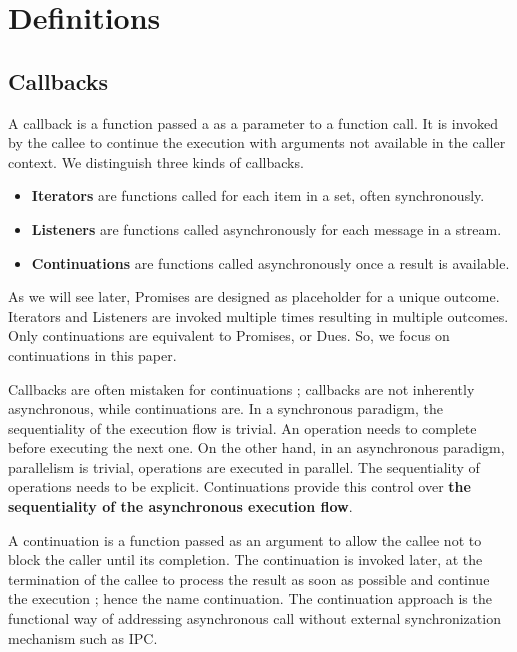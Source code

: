 \section{Definitions} \label{section:definitions}

\subsection{Callbacks} \label{section:definitions:continuation}

A callback is a function passed a as a parameter to a function call.
It is invoked by the callee to continue the execution with arguments not available in the caller context.
We distinguish three kinds of callbacks.

\begin{itemize}
  \item \textbf{Iterators} are functions called for each item in a set, often synchronously.
  \item \textbf{Listeners} are functions called asynchronously for each message in a stream.
  \item \textbf{Continuations} are functions called asynchronously once a result is available.
\end{itemize}

As we will see later, Promises are designed as placeholder for a unique outcome.
Iterators and Listeners are invoked multiple times resulting in multiple outcomes.
Only continuations are equivalent to Promises, or Dues.
So, we focus on continuations in this paper.

Callbacks are often mistaken for continuations ; callbacks are not inherently asynchronous, while continuations are.
In a synchronous paradigm, the sequentiality of the execution flow is trivial.
An operation needs to complete before executing the next one.
On the other hand, in an asynchronous paradigm, parallelism is trivial, operations are executed in parallel.
The sequentiality of operations needs to be explicit.
Continuations provide this control over \textbf{the sequentiality of the asynchronous execution flow}.

A continuation is a function passed as an argument to allow the callee not to block the caller until its completion.
The continuation is invoked later, at the termination of the callee to process the result as soon as possible and continue the execution ; hence the name continuation.
The continuation approach is the functional way of addressing asynchronous call without external synchronization mechanism such as IPC.

